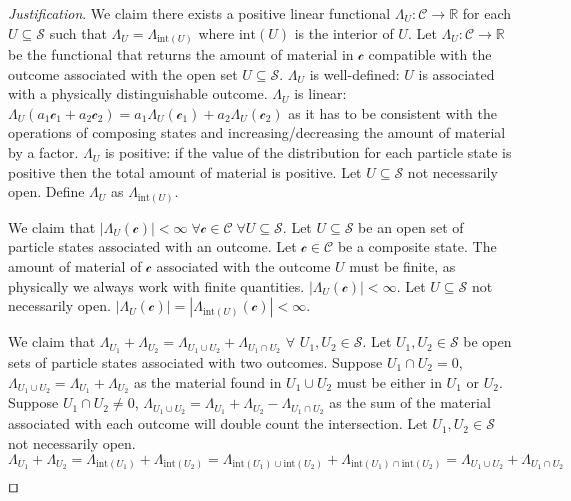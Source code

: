 \documentclass[smallextended]{svjour3}
\numberwithin{equation}{section}
\newenvironment{justification}{\emph{Justification}.}{\hfill\(\qed\)}
\begin{document}
\begin{justification}
	We claim there exists a positive linear functional $\Lambda_U : \mathcal{C} \rightarrow \mathbb{R}$ for each $U \subseteq \mathcal{S}$ such that $\Lambda_U = \Lambda_{\mathrm{int}(U)}$ where $\mathrm{int}(U)$ is the interior of $U$. Let $\Lambda_{U} : \mathcal{C} \rightarrow \mathbb{R}$ be the functional that returns the amount of material in $\mathcal{c}$ compatible with the outcome associated with the open set $U \subseteq \mathcal{S}$. $\Lambda_U$ is well-defined: $U$ is associated with a physically distinguishable outcome. $\Lambda_U$ is linear: $\Lambda_U(a_1 \mathcal{c}_1 + a_2 \mathcal{c}_2) = a_1 \Lambda_U(\mathcal{c}_1) + a_2 \Lambda_U(\mathcal{c}_2)$ as it has to be consistent with the operations of composing states and increasing/decreasing the amount of material by a factor. $\Lambda_U$ is positive: if the value of the distribution for each particle state is positive then the total amount of material is positive. Let $U \subseteq \mathcal{S}$ not necessarily open. Define $\Lambda_U$ as $\Lambda_{\mathrm{int}(U)}$.
	
	We claim that $|\Lambda_{U}(\mathcal{c})| < \infty \; \forall \mathcal{c} \in \mathcal{C} \; \forall U \subseteq \mathcal{S}$. Let $U \subseteq \mathcal{S}$ be an open set of particle states associated with an outcome. Let $\mathcal{c} \in \mathcal{C}$ be a composite state. The amount of material of $\mathcal{c}$ associated with the outcome $U$ must be finite, as physically we always work with finite quantities. $|\Lambda_{U}(\mathcal{c})| < \infty$. Let $U \subseteq \mathcal{S}$ not necessarily open. $|\Lambda_{U}(\mathcal{c})| = |\Lambda_{\mathrm{int}(U)}(\mathcal{c})| < \infty$.
	
	We claim that $\Lambda_{U_1} + \Lambda_{U_2} = \Lambda_{U_1 \cup U_2} + \Lambda_{U_1 \cap U_2}$ $\forall $ $U_1, U_2 \in \mathcal{S}$. Let $U_1, U_2 \in \mathcal{S}$ be open sets of particle states associated with two outcomes. Suppose $U_1 \cap U_2 = 0$, $\Lambda_{U_1 \cup U_2} = \Lambda_{U_1} + \Lambda_{U_2}$ as the material found in $U_1 \cup U_2$ must be either in $U_1$ or $U_2$. Suppose $U_1 \cap U_2 \neq 0$, $\Lambda_{U_1 \cup U_2} = \Lambda_{U_1} + \Lambda_{U_2} - \Lambda_{U_1 \cap U_2}$ as the sum of the material associated with each outcome will double count the intersection. Let $U_1, U_2 \in \mathcal{S}$ not necessarily open. $\Lambda_{U_1} + \Lambda_{U_2} = \Lambda_{\mathrm{int}(U_1)} + \Lambda_{\mathrm{int}(U_2)} = \Lambda_{\mathrm{int}(U_1) \cup \mathrm{int}(U_2)} + \Lambda_{\mathrm{int}(U_1) \cap \mathrm{int}(U_2)} = \Lambda_{U_1 \cup U_2} + \Lambda_{U_1 \cap U_2}$
	

\end{justification}
\end{document}
